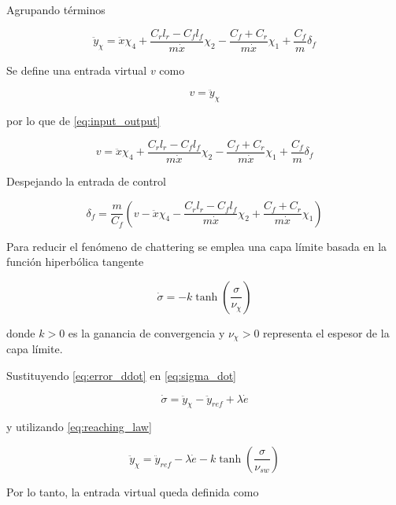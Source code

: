 \documentclass{article}
\begin{document}
Agrupando términos

\begin{equation}
\ddot y_\chi
=
\ddot{x}\chi_4
+
\frac{C_r l_r-C_f l_f}{m\dot{x}}\chi_2
-
\frac{C_f+C_r}{m\dot{x}}\chi_1
+
\frac{C_f}{m}\delta_f
\label{eq:input_output}
\end{equation}

Se define una entrada virtual $v$ como

\begin{equation}
v=\ddot y_\chi
\end{equation}

por lo que de \eqref{eq:input_output}

\begin{equation}
v
=
\ddot{x}\chi_4
+
\frac{C_r l_r-C_f l_f}{m\dot{x}}\chi_2
-
\frac{C_f+C_r}{m\dot{x}}\chi_1
+
\frac{C_f}{m}\delta_f
\end{equation}

Despejando la entrada de control

\begin{equation}
\delta_f
=
\frac{m}{C_f}
\left(
v
-\ddot{x}\chi_4
-\frac{C_r l_r-C_f l_f}{m\dot{x}}\chi_2
+\frac{C_f+C_r}{m\dot{x}}\chi_1
\right)
\label{eq:feedback_linearization}
\end{equation}

Para reducir el fenómeno de chattering se emplea una capa límite basada en la función hiperbólica tangente

\begin{equation}
\dot{\sigma}
=
-k\tanh\left(\frac{\sigma}{\nu_\chi}\right)
\label{eq:reaching_law}
\end{equation}

donde $k>0$ es la ganancia de convergencia y $\nu_\chi>0$ representa el espesor de la capa límite.

Sustituyendo \eqref{eq:error_ddot} en \eqref{eq:sigma_dot}

\begin{equation}
\dot{\sigma}
=
\ddot y_\chi
-\ddot y_{ref}
+\lambda \dot e
\end{equation}

y utilizando \eqref{eq:reaching_law}

\begin{equation}
\ddot y_\chi
=
\ddot y_{ref}
-\lambda\dot e
-k\tanh\left(\frac{\sigma}{\nu_{sw}}\right)
\end{equation}

Por lo tanto, la entrada virtual queda definida como
\end{document}
